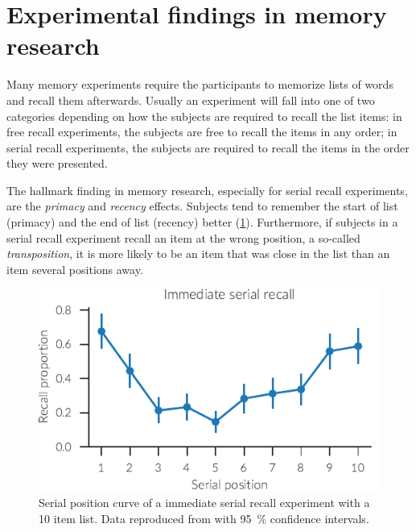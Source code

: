 \section{Experimental findings in memory research}\label{sec:exp-findings}
Many memory experiments require the participants to memorize lists of words and recall them afterwards.
Usually an experiment will fall into one of two categories depending on how the subjects are required to recall the list items: in free recall experiments, the subjects are free to recall the items in any order; in serial recall experiments, the subjects are required to recall the items in the order they were presented.

The hallmark finding in memory research, especially for serial recall experiments, are the \emph{primacy} and \emph{recency} effects.
Subjects tend to remember the start of list (primacy) and the end of list (recency) better (\cref{fig:exp-serial-pos}).
Furthermore, if subjects in a serial recall experiment recall an item at the wrong position, a so-called \emph{transposition}, it is more likely to be an item that was close in the list than an item several positions away.
\begin{figure}
    \centering
    \includegraphics{figures/exp-serial-pos}
    \caption[Immediate serial recall position curve.]{Serial position curve of a immediate serial recall experiment with a 10 item list. Data reproduced from \textcite{Jahnke1968} with \SI{95}{\percent} confidence intervals.}\label{fig:exp-serial-pos}
\end{figure}

